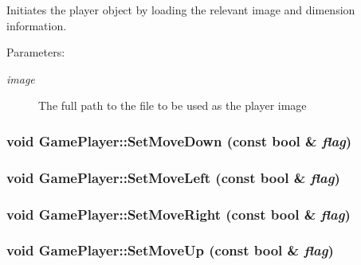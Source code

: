 Initiates the player object by loading the relevant image and dimension information.

\begin{Desc}
\item[Parameters:]
\begin{description}
\item[{\em image}]The full path to the file to be used as the player image \end{description}
\end{Desc}
\hypertarget{class_game_player_5caad1d0b2fff21b883f609cbdbd4575}{
\subsubsection[{SetMoveDown}]{\setlength{\rightskip}{0pt plus 5cm}void GamePlayer::SetMoveDown (const bool \& {\em flag})}}
\label{d7/df6/class_game_player_5caad1d0b2fff21b883f609cbdbd4575}


\hypertarget{class_game_player_336298f2d286c4b2188bc9a03fac9c6d}{
\subsubsection[{SetMoveLeft}]{\setlength{\rightskip}{0pt plus 5cm}void GamePlayer::SetMoveLeft (const bool \& {\em flag})}}
\label{d7/df6/class_game_player_336298f2d286c4b2188bc9a03fac9c6d}


\hypertarget{class_game_player_c53032c2085250782126d5969a1cba32}{
\subsubsection[{SetMoveRight}]{\setlength{\rightskip}{0pt plus 5cm}void GamePlayer::SetMoveRight (const bool \& {\em flag})}}
\label{d7/df6/class_game_player_c53032c2085250782126d5969a1cba32}


\hypertarget{class_game_player_7f790b23e90b709061b91f840dce4982}{
\subsubsection[{SetMoveUp}]{\setlength{\rightskip}{0pt plus 5cm}void GamePlayer::SetMoveUp (const bool \& {\em flag})}}
\label{d7/df6/class_game_player_7f790b23e90b709061b91f840dce4982}


